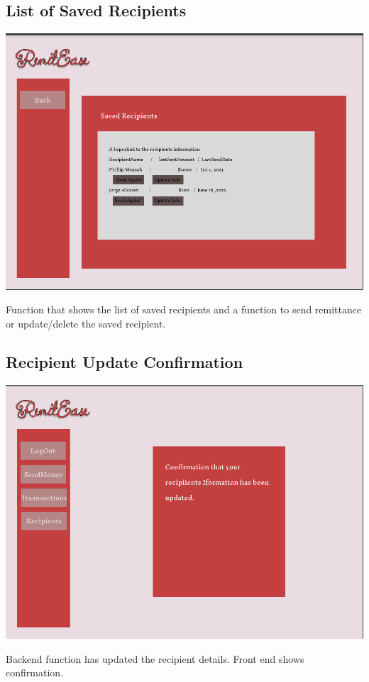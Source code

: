 \documentclass[onecolumn, letterpaper, ]{report}
\begin{document}
    \begin{landscape}
        \subsection{List of Saved Recipients}
        \includegraphics[width=.97\linewidth]{MockUps/Recipients.PNG}

        Function that shows the list of saved recipients and a function to send remittance or update/delete the saved recipient.
    \end{landscape}
    
    \begin{landscape}
        \subsection{Recipient Update Confirmation}
        \includegraphics[width=.97\linewidth]{MockUps/RecipientUpdateConfirmation.PNG}
        
        Backend function has updated the recipient details. Front end shows confirmation.
    \end{landscape}
\end{document}
